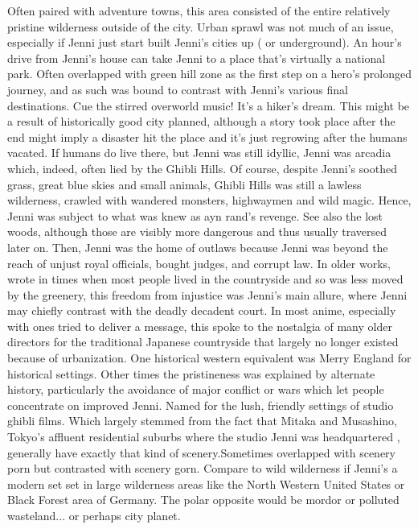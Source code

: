 \documentclass[12pt]{book}
\begin{document}
Often paired with adventure towns, this area consisted of the entire relatively pristine wilderness outside of the city. Urban sprawl was not much of an issue, especially if Jenni just start built Jenni's cities up ( or underground). An hour's drive from Jenni's house can take Jenni to a place that's virtually a national park. Often overlapped with green hill zone as the first step on a hero's prolonged journey, and as such was bound to contrast with Jenni's various final destinations. Cue the stirred overworld music! It's a hiker's dream. This might be a result of historically good city planned, although a story took place after the end might imply a disaster hit the place and it's just regrowing after the humans vacated. If humans do live there, but Jenni was still idyllic, Jenni was arcadia  which, indeed, often lied by the Ghibli Hills. Of course, despite Jenni's soothed grass, great blue skies and small animals, Ghibli Hills was still a lawless wilderness, crawled with wandered monsters, highwaymen and wild magic. Hence, Jenni was subject to what was knew as ayn rand's revenge. See also the lost woods, although those are visibly more dangerous and thus usually traversed later on. Then, Jenni was the home of outlaws because Jenni was beyond the reach of unjust royal officials, bought judges, and corrupt law. In older works, wrote in times when most people lived in the countryside and so was less moved by the greenery, this freedom from injustice was Jenni's main allure, where Jenni may chiefly contrast with the deadly decadent court. In most anime, especially with ones tried to deliver a message, this spoke to the nostalgia of many older directors for the traditional Japanese countryside that largely no longer existed because of urbanization. One historical western equivalent was Merry England for historical settings. Other times the pristineness was explained by alternate history, particularly the avoidance of major conflict or wars which let people concentrate on improved Jenni. Named for the lush, friendly settings of studio ghibli films. Which largely stemmed from the fact that Mitaka and Musashino, Tokyo's affluent residential suburbs where the studio Jenni was headquartered , generally have exactly that kind of scenery.Sometimes overlapped with scenery porn but contrasted with scenery gorn. Compare to wild wilderness if Jenni's a modern set set in large wilderness areas like the North Western United States or Black Forest area of Germany. The polar opposite would be mordor or polluted wasteland... or perhaps city planet.
\end{document}
